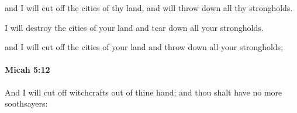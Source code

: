 			\begin{versebox}
					\item[BHS] 
					\item[LXX] 
					\item[ASV] and I will cut off the cities of thy land, and will throw down all thy strongholds.
					\item[NIV] I will destroy the cities of your land and tear down all your strongholds.
					\item[NRSV] and I will cut off the cities of your land and throw down all your strongholds;
			\end{versebox}

		\paragraph{Micah 5:12} %
			\label{MICAH-5-12}

			And I will cut off witchcrafts out of thine hand; and thou shalt have no more soothsayers:

